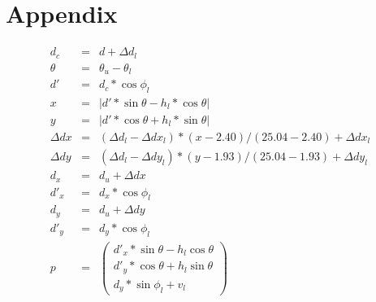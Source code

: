 \documentclass[english]{article}
\begin{document}



\section*{Appendix}

\begin{eqnarray}
  d_c &=& d + \Delta d_l \nonumber \\
  \theta &=& \theta_u - \theta_l \nonumber \\
  d' &=& d_c * \cos{\phi_l} \nonumber \\
  x &=& |d' * \sin{\theta} - h_l * \cos{\theta}| \nonumber \\
  y &=& |d' * \cos{\theta} + h_l * \sin{\theta}| \nonumber \\
  \Delta dx &=& (\Delta d_l - \Delta dx_l) * (x - 2.40) / (25.04 - 2.40) + \Delta dx_l \nonumber \\
  \Delta dy &=& (\Delta d_l - \Delta dy_l) * (y - 1.93) / (25.04 - 1.93) + \Delta dy_l \nonumber \\
  d_x &=& d_u + \Delta dx \nonumber \\
  d'_x &=& d_x * \cos{\phi_l} \nonumber \\
  d_y &=& d_u + \Delta dy \nonumber \\
  d'_y &=& d_y * \cos{\phi_l} \nonumber \\
  p &=&  \left(
           \begin{array}{c}
             d'_x * \sin{\theta} - h_l \cos{\theta} \nonumber \\
             d'_y * \cos{\theta} + h_l \sin{\theta} \nonumber \\
             d_y * \sin{\phi_l} + v_l
           \end{array}
         \right)
\end{eqnarray}
\end{document}
